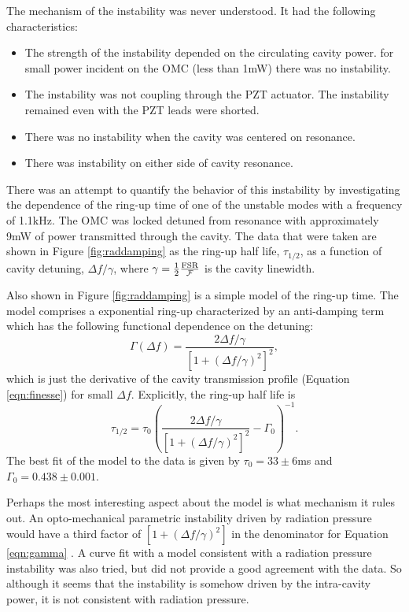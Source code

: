 The mechanism of the instability was never understood. %
It had the following characteristics:
\begin{itemize}
\item The strength of the instability depended on the circulating cavity power. for small power incident on the OMC (less than 1mW) there was no instability.
\item The instability was not coupling through the PZT actuator. The instability remained even with the PZT leads were shorted.
\item There was no instability when the cavity was centered on resonance.
\item There was instability on either side of cavity resonance.
\end{itemize}

There was an attempt to quantify the behavior of this instability by investigating the dependence of the ring-up time of one of the unstable modes with a frequency of 1.1kHz. %
The OMC was locked detuned from resonance with approximately 9mW of power transmitted through the cavity. %
The data that were taken are shown in Figure \ref{fig:raddamping} as the ring-up half life, $\tau_{1/2}$, as a function of cavity detuning, $\Delta f/\gamma$, where $\gamma= \frac{1}{2}\frac{\rm{FSR}}{\mathcal{F}}$ is the cavity linewidth.

Also shown in Figure \ref{fig:raddamping} is a simple model of the ring-up time. %
The model comprises a exponential ring-up characterized by an anti-damping term which has the following functional dependence on the detuning:
\begin{equation}
\label{eqn:gamma}
\Gamma(\Delta f)=\frac{2\Delta f/\gamma}{\left[1+\left(\Delta f/\gamma\right)^2\right]^2},
\end{equation}
which is just the derivative of the cavity transmission profile (Equation \ref{eqn:finesse}) for small $\Delta f$. %
Explicitly, the ring-up half life is
\begin{equation}
\tau_{1/2}=\tau_0\left(\frac{2\Delta f/\gamma}{\left[1+\left(\Delta f/\gamma\right)^2\right]^2}-\Gamma_0\right)^{-1}.
\end{equation}
The best fit of the model to the data is given by $\tau_0=33\pm 6$ms and $\Gamma_0=0.438\pm 0.001$.

Perhaps the most interesting aspect about the model is what mechanism it rules out. %
An opto-mechanical parametric instability driven by radiation pressure would have a third factor of $\left[1+\left(\Delta f/\gamma\right)^2\right]$ in the denominator for Equation \ref{eqn:gamma} \cite{Corbitt:7mK}. %
A curve fit with a model consistent with a radiation pressure instability was also tried, but did not provide a good agreement with the data. %
So although it seems that the instability is somehow driven by the intra-cavity power, it is not consistent with radiation pressure.

